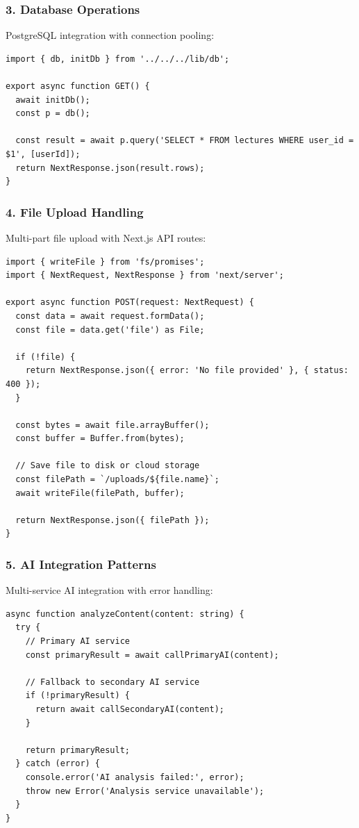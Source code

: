 \documentclass[12pt,a4paper]{article}
\begin{document}
\subsubsection{3. Database Operations}
PostgreSQL integration with connection pooling:
\begin{lstlisting}[caption=Database Operations]
import { db, initDb } from '../../../lib/db';

export async function GET() {
  await initDb();
  const p = db();

  const result = await p.query('SELECT * FROM lectures WHERE user_id = $1', [userId]);
  return NextResponse.json(result.rows);
}
\end{lstlisting}

\subsubsection{4. File Upload Handling}
Multi-part file upload with Next.js API routes:
\begin{lstlisting}[caption=File Upload API]
import { writeFile } from 'fs/promises';
import { NextRequest, NextResponse } from 'next/server';

export async function POST(request: NextRequest) {
  const data = await request.formData();
  const file = data.get('file') as File;

  if (!file) {
    return NextResponse.json({ error: 'No file provided' }, { status: 400 });
  }

  const bytes = await file.arrayBuffer();
  const buffer = Buffer.from(bytes);

  // Save file to disk or cloud storage
  const filePath = `/uploads/${file.name}`;
  await writeFile(filePath, buffer);

  return NextResponse.json({ filePath });
}
\end{lstlisting}

\subsubsection{5. AI Integration Patterns}
Multi-service AI integration with error handling:
\begin{lstlisting}[caption=AI Service Integration]
async function analyzeContent(content: string) {
  try {
    // Primary AI service
    const primaryResult = await callPrimaryAI(content);

    // Fallback to secondary AI service
    if (!primaryResult) {
      return await callSecondaryAI(content);
    }

    return primaryResult;
  } catch (error) {
    console.error('AI analysis failed:', error);
    throw new Error('Analysis service unavailable');
  }
}
\end{lstlisting}
\end{document}

